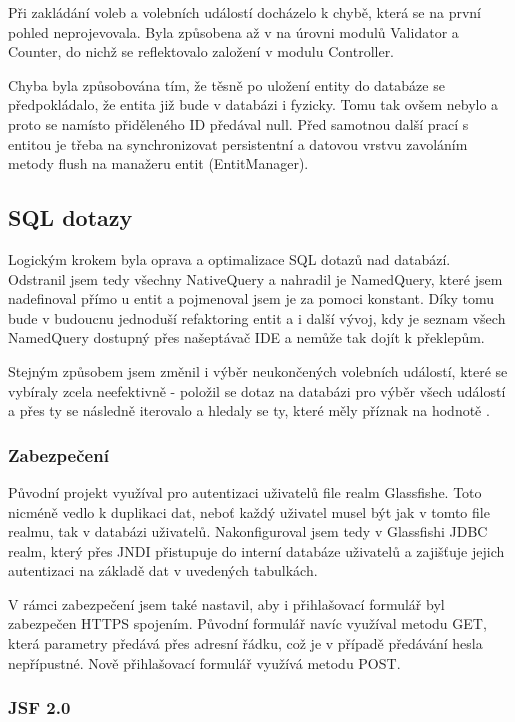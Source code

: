 \documentclass[11pt,twoside,a4paper]{book}
\begin{document}
Při zakládání voleb a volebních událostí docházelo k chybě, která se na první pohled neprojevovala. Byla způsobena až v na úrovni modulů Validator a Counter, do nichž se reflektovalo založení v modulu Controller. 

Chyba byla způsobována tím, že těsně po uložení entity do databáze se předpokládalo, že entita již bude v databázi i fyzicky. Tomu tak ovšem nebylo a proto se namísto přiděleného ID předával null. Před samotnou další prací s entitou je třeba na synchronizovat persistentní a datovou vrstvu zavoláním metody flush na manažeru entit (EntitManager).

\subsection{SQL dotazy}

Logickým krokem byla oprava a optimalizace SQL dotazů nad databází. Odstranil jsem tedy všechny NativeQuery a nahradil je NamedQuery, které jsem nadefinoval přímo u entit a pojmenoval jsem je za pomoci konstant. Díky tomu bude v budoucnu jednoduší refaktoring entit a i další vývoj, kdy je seznam všech NamedQuery dostupný přes našeptávač IDE a nemůže tak dojít k překlepům.

Stejným způsobem jsem změnil i výběr neukončených volebních událostí, které se vybíraly zcela neefektivně - položil se dotaz na databázi pro výběr všech událostí a přes ty se následně iterovalo a hledaly se ty, které měly příznak  na hodnotě .

\subsubsection{Zabezpečení}

Původní projekt využíval pro autentizaci uživatelů file realm Glassfishe. Toto nicméně vedlo k duplikaci dat, neboť každý uživatel musel být jak v tomto file realmu, tak v databázi uživatelů. Nakonfiguroval jsem tedy v Glassfishi JDBC realm, který přes JNDI přistupuje do interní databáze uživatelů a zajišťuje jejich autentizaci na základě dat v uvedených tabulkách.

V rámci zabezpečení jsem také nastavil, aby i přihlašovací formulář byl zabezpečen HTTPS spojením. Původní formulář navíc využíval metodu GET, která parametry předává přes adresní řádku, což je v případě předávání hesla nepřípustné. Nově přihlašovací formulář využívá metodu POST.

\subsubsection{JSF 2.0}
\end{document}
